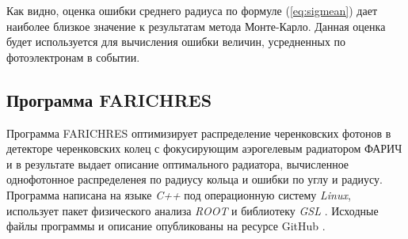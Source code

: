 \documentclass[12pt]{article}
\begin{document}
Как видно, оценка ошибки среднего радиуса по формуле (\ref{eq:sigmean}) дает наиболее близкое значение к результатам 
метода Монте-Карло. Данная оценка будет используется для вычисления ошибки величин, усредненных по фотоэлектронам в событии.

\subsection{Программа FARICHRES}
Программа FARICHRES оптимизирует распределение черенковских фотонов в детекторе 
черенковских колец с фокусирующим аэрогелевым радиатором ФАРИЧ и в результате выдает описание оптимального радиатора,
вычисленное однофотонное распределенея по радиусу кольца и ошибки по углу и радиусу. 
Программа написана на языке {\em C++} под операционную систему {\em Linux}, использует пакет 
физического анализа {\em ROOT} \cite{root} и библиотеку {\em GSL} \cite{gsl}.
Исходные файлы программы и описание опубликованы на ресурсе GitHub \cite{github_farich}.
\end{document}
